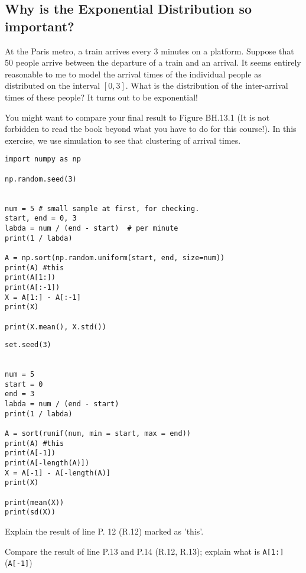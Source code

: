 

\subsection{Why is the Exponential Distribution so important?}

At the Paris metro, a train arrives every 3 minutes on a platform.
Suppose that 50 people arrive between the departure of a train and an arrival.
It seems entirely reasonable to me to model the arrival times of the individual people as distributed on the interval \([0,3]\).
What is the distribution of the inter-arrival times of these people?
It turns out to be exponential!

You might want to compare your final result to Figure BH.13.1 (It is not forbidden to read the book beyond what you have to do for this course!).
In this exercise, we use simulation to see that clustering of arrival times.


\begin{verbatim}
import numpy as np

np.random.seed(3)


num = 5 # small sample at first, for checking.
start, end = 0, 3
labda = num / (end - start)  # per minute
print(1 / labda)

A = np.sort(np.random.uniform(start, end, size=num))
print(A) #this
print(A[1:])
print(A[:-1])
X = A[1:] - A[:-1]
print(X)

print(X.mean(), X.std())
\end{verbatim}


\begin{verbatim}
set.seed(3)


num = 5
start = 0
end = 3
labda = num / (end - start)
print(1 / labda)

A = sort(runif(num, min = start, max = end))
print(A) #this
print(A[-1])
print(A[-length(A)])
X = A[-1] - A[-length(A)]
print(X)

print(mean(X))
print(sd(X))
\end{verbatim}

\begin{exercise}
Explain the result of line P. 12 (R.12) marked as 'this'.
\end{exercise}

\begin{exercise}
Compare the result of  line P.13 and P.14 (R.12, R.13);  explain what is \texttt{A[1:]} (\texttt{A[-1]})
\end{exercise}

